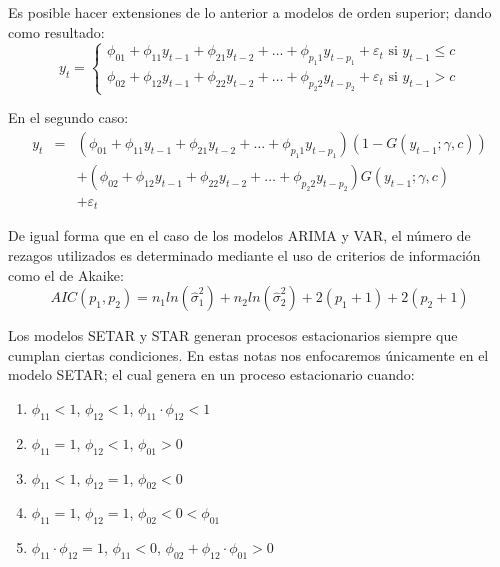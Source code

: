 \documentclass[
]{book}
\begin{document}
Es posible hacer extensiones de lo anterior a modelos de orden superior; dando como resultado:
\begin{equation}
    y_t = 
    \begin{cases}
        \phi_{01} + \phi_{11} y_{t-1} + \phi_{21} y_{t-2} + \ldots + \phi_{p_1 1} y_{t-p_1} + \varepsilon_t \text{ si } y_{t-1} \leq c \\
        \phi_{02} + \phi_{12} y_{t-1} + \phi_{22} y_{t-2} + \ldots + \phi_{p_2 2} y_{t-p_2} + \varepsilon_t \text{ si } y_{t-1} > c 
    \end{cases}
\end{equation}

En el segundo caso:
\begin{eqnarray*}
    y_t & = & (\phi_{01} + \phi_{11} y_{t-1} + \phi_{21} y_{t-2} + \ldots + \phi_{p_1 1} y_{t-p_1}) (1 - G(y_{t-1}; \gamma, c)) \\
    &  & + (\phi_{02} + \phi_{12} y_{t-1} + \phi_{22} y_{t-2} + \ldots + \phi_{p_2 2} y_{t-p_2}) G(y_{t-1}; \gamma, c) \\
    &  & + \varepsilon_t
\end{eqnarray*}

De igual forma que en el caso de los modelos ARIMA y VAR, el número de rezagos utilizados es determinado mediante el uso de criterios de información como el de Akaike:
\begin{equation}
    AIC(p_1, p_2) = n_1 ln(\hat{\sigma}^2_1) + n_2 ln(\hat{\sigma}^2_2) + 2(p_1 + 1) + 2(p_2 + 1)
\end{equation}

Los modelos SETAR y STAR generan procesos estacionarios siempre que cumplan ciertas condiciones. En estas notas nos enfocaremos únicamente en el modelo SETAR; el cual genera en un proceso estacionario cuando:

\begin{enumerate}
    \item $\phi_{11} < 1$, $\phi_{12} < 1$, $\phi_{11} \cdot \phi_{12} < 1$
    
    \item $\phi_{11} = 1$, $\phi_{12} < 1$, $\phi_{01} > 0$
    
    \item $\phi_{11} < 1$, $\phi_{12} = 1$, $\phi_{02} < 0$
    
    \item $\phi_{11} = 1$, $\phi_{12} = 1$, $\phi_{02} < 0 < \phi_{01}$
    
    \item $\phi_{11} \cdot \phi_{12} = 1$, $\phi_{11} < 0$, $\phi_{02} + \phi_{12} \cdot \phi_{01} > 0$
\end{enumerate}
\end{document}
